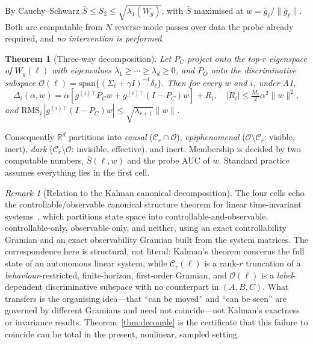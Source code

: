 \documentclass[11pt]{article}
\newtheorem{theorem}{Theorem}
\theoremstyle{definition}
\theoremstyle{remark}
\newtheorem{remark}{Remark}
\newcommand{\Sbar}{\bar{S}}
\newcommand{\gbar}{\bar{g}}
\newcommand{\Wg}{W_{g}}
\begin{document}
By Cauchy--Schwarz $\Sbar\le S_2\le\sqrt{\lambda_1(\Wg)}$, with $\Sbar$
maximised at $w=\gbar_\ell/\|\gbar_\ell\|$. Both are computable from $N$
reverse-mode passes over data the probe already required, and \emph{no
intervention is performed}.

\begin{theorem}[Three-way decomposition]
\label{thm:decomp}
Let $P_C$ project onto the top-$r$ eigenspace of $\Wg(\ell)$ with eigenvalues
$\lambda_1\ge\cdots\ge\lambda_d\ge0$, and $P_O$ onto the discriminative subspace
$\mathcal{O}(\ell)=\mathrm{span}\{(\Sigma_\ell+\gamma I)^{-1}\delta_\ell\}$. Then
for every $w$ and $i$, under A1,
\begin{equation}
\Delta_i(\alpha,w) = \alpha\left[g^{(i)\top}P_C w + g^{(i)\top}(I-P_C)w\right] + R_i,
\quad |R_i| \le \tfrac{M_\ell}{2}\alpha^2\|w\|^2,
\end{equation}
and $\mathrm{RMS}_i\,|g^{(i)\top}(I-P_C)w| \le \sqrt{\lambda_{r+1}}\|w\|$.
\end{theorem}

Consequently $\mathbb{R}^d$ partitions into \emph{causal} ($\mathcal{C}_r\cap\mathcal{O}$),
\emph{epiphenomenal} ($\mathcal{O}\setminus\mathcal{C}_r$: visible, inert),
\emph{dark} ($\mathcal{C}_r\setminus\mathcal{O}$: invisible, effective), and inert.
Membership is decided by two computable numbers, $\Sbar(\ell,w)$ and the probe
AUC of $w$. Standard practice assumes everything lies in the first cell.

\begin{remark}[Relation to the Kalman canonical decomposition]
\label{rem:kalman}
The four cells echo the controllable/observable canonical structure theorem
for linear time-invariant systems~\cite{kalman1963}, which partitions state
space into controllable-and-observable, controllable-only, observable-only,
and neither, using an exact controllability Gramian and an exact
observability Gramian built from the system matrices. The correspondence
here is structural, not literal: Kalman's theorem concerns the full state of
an autonomous linear system, while $\mathcal C_r(\ell)$ is a rank-$r$
truncation of a \emph{behaviour}-restricted, finite-horizon, first-order
Gramian, and $\mathcal O(\ell)$ is a \emph{label}-dependent discriminative
subspace with no counterpart in $(A,B,C)$. What transfers is the organising
idea---that ``can be moved'' and ``can be seen'' are governed by different
Gramians and need not coincide---not Kalman's exactness or invariance
results. Theorem~\ref{thm:decouple} is the certificate that this failure to
coincide can be total in the present, nonlinear, sampled setting.
\end{remark}
\end{document}
